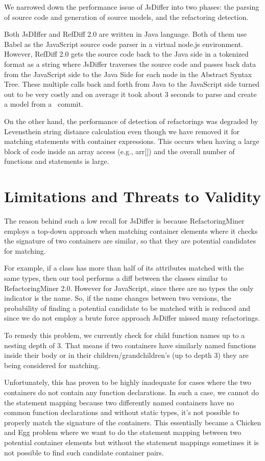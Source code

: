 \documentclass[letterpaper,12pt,onecolumn,final]{report}
\begin{document}
We narrowed down the performance issue of JsDiffer into two phases: the parsing of source code and generation of source models, and the refactoring detection.

Both JsDIffer and RefDiff 2.0 are written in Java language. Both of them use Babel as the JavaScript source code parser in a virtual node.js environment. However, RefDiff 2.0 gets the source code back to the Java side in a tokenized format as a string where JsDiffer traverses the source code and passes back data from the JavaScript side to the Java Side for each node in the Abstract Syntax Tree. These multiple calls back and forth from Java to the JavaScript side turned out to be very costly and on average it took about 3 seconds to parse and create a model from a  commit.

On the other hand, the performance of detection of refactorings was degraded by Levensthein string distance calculation even though we have removed it for matching statements with container expressions. This occurs when having a large block of code inside an array access (e.g., arr[]) and the overall number of functions and statements is large.

\section{Limitations and Threats to Validity}
The reason behind such a low recall for JsDiffer is because RefactoringMiner employs a top-down approach when matching container elements where it checks the signature of two containers are similar, so that they are potential candidates for matching.

For example, if a class has more than half of its attributes matched with the same types, then our tool performs a diff between the classes similar to RefactoringMiner 2.0. However for JavaScript, since there are no types the only indicator is the name. So, if the name changes between two versions, the probability of finding a potential candidate to be matched with is reduced and since we do not employ a brute force approach JsDiffer missed many refactorings.


To remedy this problem, we currently check for child function names up to a nesting depth of 3. That means if two containers have similarly named functions inside their body or in their children/grandchildren's (up to depth 3) they are being considered for matching.

Unfortunately, this has proven to be highly inadequate for cases where the two containers do not contain any function declarations. In such a case, we cannot do the statement mapping because two differently named containers have no common function declarations and without static types, it's not possible to properly match the signature of the containers. This essentially became a Chicken and Egg problem where we want to do the statement mapping between two potential container elements but without the statement mappings sometimes it is not possible to find such candidate container pairs.
\end{document}

